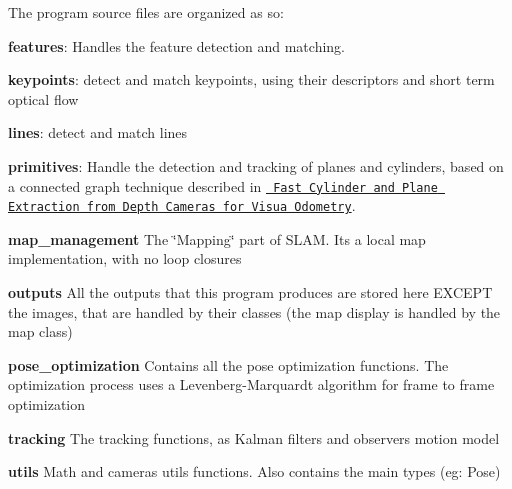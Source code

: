 The program source files are organized as so\+:
\begin{DoxyItemize}
\item {\bfseries{features}}\+: Handles the feature detection and matching.
\begin{DoxyItemize}
\item {\bfseries{keypoints}}\+: detect and match keypoints, using their descriptors and short term optical flow
\item {\bfseries{lines}}\+: detect and match lines
\item {\bfseries{primitives}}\+: Handle the detection and tracking of planes and cylinders, based on a connected graph technique described in \href{https://arxiv.org/pdf/1803.02380.pdf}{\texttt{ Fast Cylinder and Plane Extraction from Depth Cameras for Visua Odometry}}.
\end{DoxyItemize}
\item {\bfseries{map\+\_\+management}} The \char`\"{}\+Mapping\char`\"{} part of SLAM. It\textquotesingle{}s a local map implementation, with no loop closures
\item {\bfseries{outputs}} All the outputs that this program produces are stored here EXCEPT the images, that are handled by their classes (the map display is handled by the map class)
\item {\bfseries{pose\+\_\+optimization}} Contains all the pose optimization functions. The optimization process uses a Levenberg-\/\+Marquardt algorithm for frame to frame optimization
\item {\bfseries{tracking}} The tracking functions, as Kalman filters and observers motion model
\item {\bfseries{utils}} Math and cameras utils functions. Also contains the main types (eg\+: Pose) 
\end{DoxyItemize}
